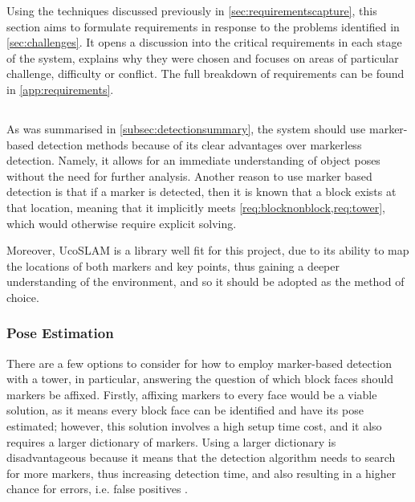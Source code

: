 Using the techniques discussed previously in \cref{sec:requirementscapture}, this section aims to formulate requirements in response to the problems identified in \cref{sec:challenges}. It opens a discussion into the critical requirements in each stage of the system, explains why they were chosen and focuses on areas of particular challenge, difficulty or conflict. The full breakdown of requirements can be found in \cref{app:requirements}.

\subsection{\detection}



As was summarised in \cref{subsec:detectionsummary}, the system should use marker-based detection methods because of its clear advantages over markerless detection. Namely, it allows for an immediate understanding of object poses without the need for further analysis. Another reason to use marker based detection is that if a marker is detected, then it is known that a block exists at that location, meaning that it implicitly meets \cref{req:blocknonblock,req:tower}, which would otherwise require explicit solving.

Moreover, UcoSLAM is a library well fit for this project, due to its ability to map the locations of both markers and key points, thus gaining a deeper understanding of the environment, and so it should be adopted as the method of choice.

\subsubsection{Pose Estimation}\label{subsec:poseestimation}

There are a few options to consider for how to employ marker-based detection with a \jenga{} tower, in particular, answering the question of which block faces should markers be affixed. Firstly, affixing markers to every face would be a viable solution, as it means every block face can be identified and have its pose estimated; however, this solution involves a high setup time cost, and it also requires a larger dictionary of markers. Using a larger dictionary is disadvantageous because it means that the detection algorithm needs to search for more markers, thus increasing detection time, and also resulting in a higher chance for errors, i.e. false positives \citep{ucoslampaper}.

